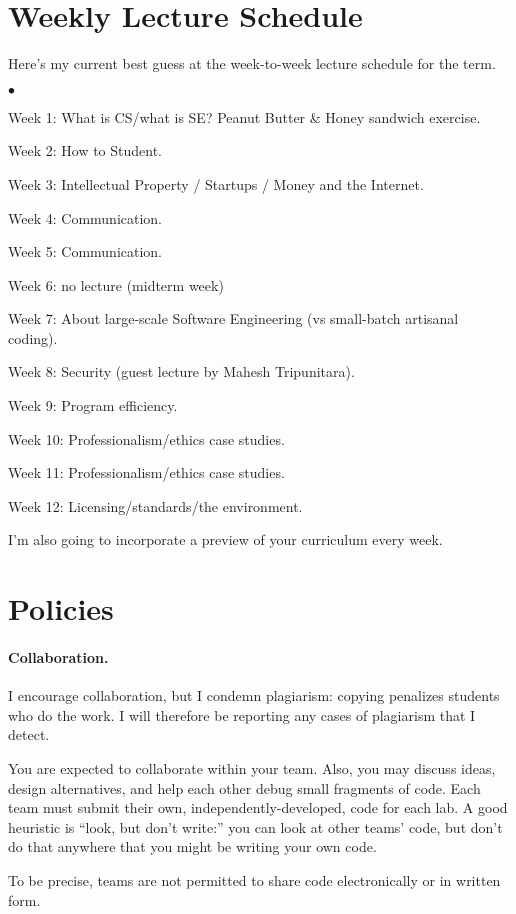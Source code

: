 \documentclass[11pt,onecolumn]{article}
\newcommand{\squishlist}{
 \begin{list}{$\bullet$}
  { \setlength{\itemsep}{0pt}
     \setlength{\parsep}{3pt}
     \setlength{\topsep}{3pt}
     \setlength{\partopsep}{0pt}
     \setlength{\leftmargin}{1.5em}
     \setlength{\labelwidth}{1em}
     \setlength{\labelsep}{0.5em} } }
\newcommand{\squishend}{
  \end{list}  }
\begin{document}
\section*{Weekly Lecture Schedule}
Here's my current best guess at the week-to-week lecture schedule for the term.
\squishlist
\item Week 1: What is CS/what is SE? Peanut Butter \& Honey sandwich exercise.
\item Week 2: How to Student.
\item Week 3: Intellectual Property / Startups / Money and the Internet.
\item Week 4: Communication.
\item Week 5: Communication.
\item Week 6: no lecture (midterm week)
\item Week 7: About large-scale Software Engineering (vs small-batch artisanal coding).
\item Week 8: Security (guest lecture by Mahesh Tripunitara).
\item Week 9: Program efficiency.
\item Week 10: Professionalism/ethics case studies.
\item Week 11: Professionalism/ethics case studies.
\item Week 12: Licensing/standards/the environment.
\squishend
I'm also going to incorporate a preview of your curriculum every week.

\section*{Policies}

\paragraph{Collaboration.} I encourage collaboration, but I condemn 
plagiarism: copying penalizes students who do the work. I will therefore
be reporting any cases of plagiarism that I detect.

You are expected to collaborate within your team. Also, you may
discuss ideas, design alternatives, and help each other debug small
fragments of code. Each team must submit their own,
independently-developed, code for each lab. A good heuristic is
``look, but don't write:'' you can look at other teams' code, but
don't do that anywhere that you might be writing your own code.

To be precise, teams are not permitted to share code electronically
or in written form.
\end{document}
